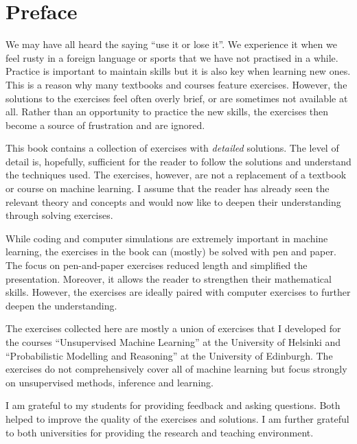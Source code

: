 \chapter{Preface}
\label{ch:preface}
We may have all heard the saying ``use it or lose it''. We experience it when we
feel rusty in a foreign language or sports that we have not practised in a
while. Practice is important to maintain skills but it is also key when learning
new ones. This is a reason why many textbooks and courses feature exercises.
However, the solutions to the exercises feel often overly brief, or are
sometimes not available at all. Rather than an opportunity to practice the new
skills, the exercises then become a source of frustration and are ignored.

\hspace{2ex} This book contains a collection of exercises with \emph{detailed}
solutions. The level of detail is, hopefully, sufficient for the reader to
follow the solutions and understand the techniques used. The exercises, however,
are not a replacement of a textbook or course on machine learning. I assume that
the reader has already seen the relevant theory and concepts and would now like
to deepen their understanding through solving exercises.

\hspace{2ex} While coding and computer simulations are extremely important in
machine learning, the exercises in the book can (mostly) be solved with pen and
paper. The focus on pen-and-paper exercises reduced length and simplified the
presentation. Moreover, it allows the reader to strengthen their mathematical
skills. However, the exercises are ideally paired with computer exercises to
further deepen the understanding.

\hspace{2ex} The exercises collected here are mostly a union of exercises that I
developed for the courses ``Unsupervised Machine Learning'' at the University of
Helsinki and ``Probabilistic Modelling and Reasoning'' at the University of
Edinburgh. The exercises do not comprehensively cover all of machine learning
but focus strongly on unsupervised methods, inference and learning.

\hspace{2ex} I am grateful to my students for providing feedback and asking
questions. Both helped to improve the quality of the exercises and solutions. I
am further grateful to both universities for providing the research and teaching
environment.

